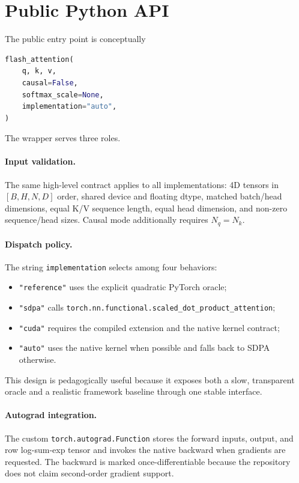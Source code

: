 \section{Public Python API}

The public entry point is conceptually
\begin{lstlisting}[language=Python,caption={Public API shape.}]
flash_attention(
    q, k, v,
    causal=False,
    softmax_scale=None,
    implementation="auto",
)
\end{lstlisting}

The wrapper serves three roles.

\paragraph{Input validation.}
The same high-level contract applies to all implementations: 4D tensors in $[B,H,N,D]$ order, shared device and floating dtype, matched batch/head dimensions, equal K/V sequence length, equal head dimension, and non-zero sequence/head sizes. Causal mode additionally requires $N_q=N_k$.

\paragraph{Dispatch policy.}
The string \texttt{implementation} selects among four behaviors:
\begin{itemize}
  \item \texttt{"reference"} uses the explicit quadratic PyTorch oracle;
  \item \texttt{"sdpa"} calls \texttt{torch.nn.functional.scaled\_dot\_product\_attention};
  \item \texttt{"cuda"} requires the compiled extension and the native kernel contract;
  \item \texttt{"auto"} uses the native kernel when possible and falls back to SDPA otherwise.
\end{itemize}
This design is pedagogically useful because it exposes both a slow, transparent oracle and a realistic framework baseline through one stable interface.

\paragraph{Autograd integration.}
The custom \texttt{torch.autograd.Function} stores the forward inputs, output, and row log-sum-exp tensor and invokes the native backward when gradients are requested. The backward is marked once-differentiable because the repository does not claim second-order gradient support.

